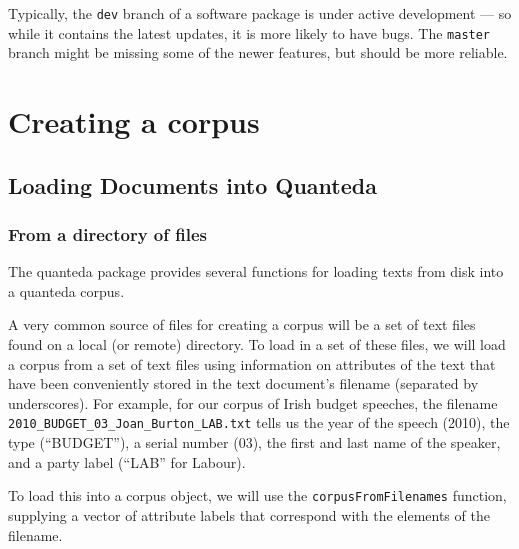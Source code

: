 \documentclass[11pt]{article}\usepackage[]{graphicx}\usepackage[]{color}
\begin{document}
Typically, the \texttt{dev} branch of a software package is under active development --- so while it contains the latest updates, it is more likely to have bugs. The \texttt{master} branch might be missing some of the newer features, but should be more reliable.

\section{Creating a corpus}

\subsection{Loading Documents into Quanteda}

\subsubsection{From a directory of files}

The quanteda package provides several functions for loading texts from disk into a quanteda corpus.

A very common source of files for creating a corpus will be a set of
text files found on a local (or remote) directory.  To load in a set
of these files, we will load a corpus from a set of text files using
information on attributes of the text that have been conveniently
stored in the text document's filename (separated by underscores).
For example, for our corpus of Irish budget speeches, the filename
\texttt{2010\_BUDGET\_03\_Joan\_Burton\_LAB.txt} tells us the year of
the speech (2010), the type (``BUDGET''), a serial number (03), the
first and last name of the speaker, and a party label (``LAB'' for
Labour).

To load this into a corpus object, we will use the
\texttt{corpusFromFilenames} function, supplying a vector of attribute
labels that correspond with the elements of the filename.
\end{document}
